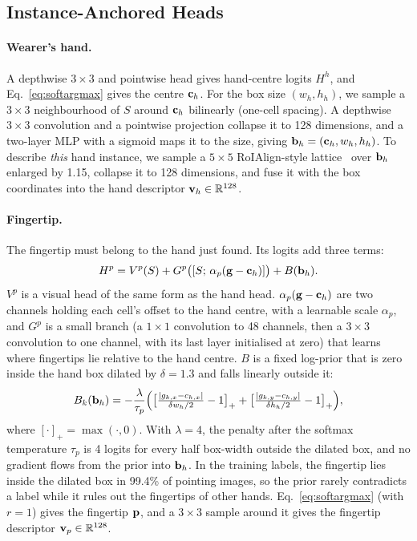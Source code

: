\subsection{Instance-Anchored Heads}\label{sec:heads}

\paragraph{Wearer's hand.} A depthwise $3\times3$ and pointwise head gives hand-centre logits $H^h$, and Eq.~\eqref{eq:softargmax} gives the centre $\mathbf{c}_h$. For the box size $(w_h,h_h)$, we sample a $3\times3$ neighbourhood of $S$ around $\mathbf{c}_h$ bilinearly (one-cell spacing). A depthwise $3\times3$ convolution and a pointwise projection collapse it to 128 dimensions, and a two-layer MLP with a sigmoid maps it to the size, giving $\mathbf{b}_h=(\mathbf{c}_h,w_h,h_h)$. To describe \emph{this} hand instance, we sample a $5\times5$ RoIAlign-style lattice~\cite{he2017mask} over $\mathbf{b}_h$ enlarged by 1.15, collapse it to 128 dimensions, and fuse it with the box coordinates into the hand descriptor $\mathbf{v}_h\in\mathbb{R}^{128}$.

\paragraph{Fingertip.} The fingertip must belong to the hand just found. Its logits add three terms:
\begin{equation}
H^p = V^p(S) + G^p\big([S;\,\alpha_p(\mathbf{g}-\mathbf{c}_h)]\big) + B(\mathbf{b}_h).
\label{eq:tip}
\end{equation}
$V^p$ is a visual head of the same form as the hand head. $\alpha_p(\mathbf{g}-\mathbf{c}_h)$ are two channels holding each cell's offset to the hand centre, with a learnable scale $\alpha_p$, and $G^p$ is a small branch (a $1\times1$ convolution to 48 channels, then a $3\times3$ convolution to one channel, with its last layer initialised at zero) that learns where fingertips lie relative to the hand centre. $B$ is a fixed log-prior that is zero inside the hand box dilated by $\delta{=}1.3$ and falls linearly outside it:
\begin{equation}
B_k(\mathbf{b}_h) = -\frac{\lambda}{\tau_p}\Big(\big[\tfrac{|g_{k,x}-c_{h,x}|}{\delta w_h/2}-1\big]_+ + \big[\tfrac{|g_{k,y}-c_{h,y}|}{\delta h_h/2}-1\big]_+\Big),
\end{equation}
where $[\cdot]_+=\max(\cdot,0)$. With $\lambda{=}4$, the penalty after the softmax temperature $\tau_p$ is 4 logits for every half box-width outside the dilated box, and no gradient flows from the prior into $\mathbf{b}_h$. In the training labels, the fingertip lies inside the dilated box in 99.4\% of pointing images, so the prior rarely contradicts a label while it rules out the fingertips of other hands. Eq.~\eqref{eq:softargmax} (with $r{=}1$) gives the fingertip $\mathbf{p}$, and a $3\times3$ sample around it gives the fingertip descriptor $\mathbf{v}_p\in\mathbb{R}^{128}$.

